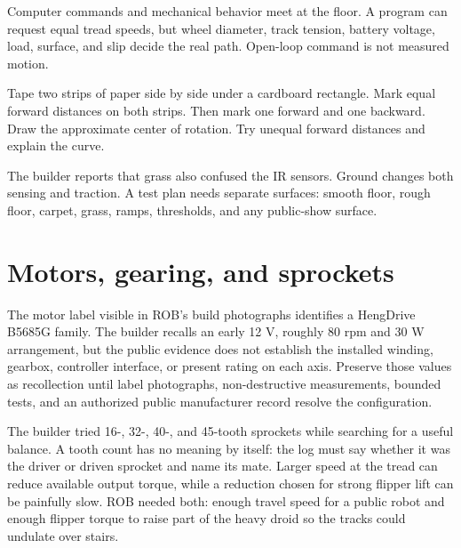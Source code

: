 \documentclass[11pt,openany]{book}
\begin{document}
\begin{conceptbox}
Computer commands and mechanical behavior meet at the floor. A program can request equal tread speeds, but wheel diameter, track tension, battery voltage, load, surface, and slip decide the real path. Open-loop command is not measured motion.
\end{conceptbox}

\begin{buildbox}[title={PAPER TREAD PATHS}]
Tape two strips of paper side by side under a cardboard rectangle. Mark equal forward distances on both strips. Then mark one forward and one backward. Draw the approximate center of rotation. Try unequal forward distances and explain the curve.
\end{buildbox}

\begin{fieldnotebox}
The builder reports that grass also confused the IR sensors. Ground changes both sensing and traction. A test plan needs separate surfaces: smooth floor, rough floor, carpet, grass, ramps, thresholds, and any public-show surface.
\end{fieldnotebox}



\chapter{Motors, gearing, and sprockets}

The motor label visible in ROB's build photographs identifies a HengDrive B5685G family. The builder recalls an early 12 V, roughly 80 rpm and 30 W arrangement, but the public evidence does not establish the installed winding, gearbox, controller interface, or present rating on each axis. Preserve those values as recollection until label photographs, non-destructive measurements, bounded tests, and an authorized public manufacturer record resolve the configuration.

The builder tried 16-, 32-, 40-, and 45-tooth sprockets while searching for a useful balance. A tooth count has no meaning by itself: the log must say whether it was the driver or driven sprocket and name its mate. Larger speed at the tread can reduce available output torque, while a reduction chosen for strong flipper lift can be painfully slow. ROB needed both: enough travel speed for a public robot and enough flipper torque to raise part of the heavy droid so the tracks could undulate over stairs.
\end{document}
